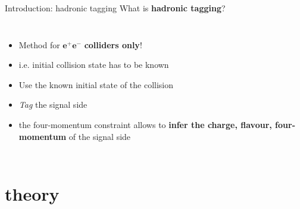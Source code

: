 \documentclass[xcolor=dvipsnames]{beamer}
\begin{document}
\begin{frame}{Introduction: hadronic tagging}
\centering\scriptsize
{\normalsize What is \textbf{hadronic tagging}?}

\vspace{10pt}

\begin{columns}
   

   \begin{itemize}
      \item Method for $\boldsymbol{e^+}\boldsymbol{e^-}$ \textbf{colliders only}!
      \item[\ra] i.e. initial collision state has to be known 
      \item Use the known initial state of the \epem collision
      \item \textit{Tag} the signal side
      \item[\ra] the four-momentum constraint allows to \textbf{infer the charge, flavour, four-momentum} of the signal side
   \end{itemize}
\end{columns}


\end{frame}


\section{\safeBtoXsgamma theory}
\end{document}
